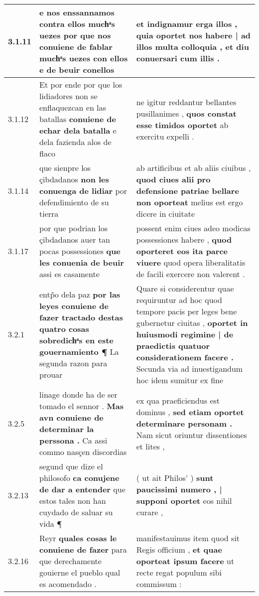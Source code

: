 \begin{tabular}{|p{1cm}|p{6.5cm}|p{6.5cm}|}
3.1.11 & e nos enssannamos contra ellos muchͣs uezes \textbf{ por que nos conuiene de fablar muchͣs uezes con ellos } e de beuir conellos & et indignamur erga illos , \textbf{ quia oportet nos habere | ad illos multa colloquia , } et diu conuersari cum illis . \\\hline
3.1.12 & Et por ende por que los lidiadores non se enflaquezcan en las batallas \textbf{ conuiene de echar dela batalla } e dela fazienda alos de flaco & ne igitur reddantur bellantes pusillanimes , \textbf{ quos constat esse timidos oportet } ab exercitu expelli . \\\hline
3.1.14 & que sienpre los çibdadanos \textbf{ non les conuenga de lidiar } por defendimiento de su tierra & ab artificibus et ab aliis ciuibus , \textbf{ quod ciues alii pro defensione patriae bellare non oporteat } melius est ergo dicere in ciuitate \\\hline
3.1.17 & por que podrian los çibdadanos auer tan pocas possessiones \textbf{ que les conuenia de beuir } assi es casamente & possent enim ciues adeo modicas possessiones habere , \textbf{ quod oporteret eos ita parce viuere } quod opera liberalitatis de facili exercere non valerent . \\\hline
3.2.1 & entp̃o dela paz \textbf{ por las leyes conuiene de fazer tractado destas quatro cosas sobredichͣs en este gouernamiento ¶ } La segunda razon para prouar & Quare si considerentur quae requiruntur ad hoc quod tempore pacis per leges bene gubernetur ciuitas , \textbf{ oportet in huiusmodi regimine | de praedictis quatuor considerationem facere . } Secunda via ad inuestigandum hoc idem sumitur ex fine \\\hline
3.2.5 & linage donde ha de ser tomado el sennor . \textbf{ Mas avn conuiene de determinar la perssona . } Ca assi commo nasçen discordias & ex qua praeficiendus est dominus , \textbf{ sed etiam oportet determinare personam . } Nam sicut oriuntur dissentiones et lites , \\\hline
3.2.13 & segund que dize el philosofo \textbf{ ca conujene de dar a entender } que estos tales non han cuydado de saluar su vida ¶ & ( ut ait Philos’ ) \textbf{ sunt paucissimi numero , | supponi oportet } eos nihil curare , \\\hline
3.2.16 & Reyr \textbf{ quales cosas le conuiene de fazer } para que derechamente gouierne el pueblo qual es acomendado . & manifestauimus item quod sit Regis officium , \textbf{ et quae oporteat ipsum facere } ut recte regat populum sibi commissum : \\\hline

\end{tabular}
